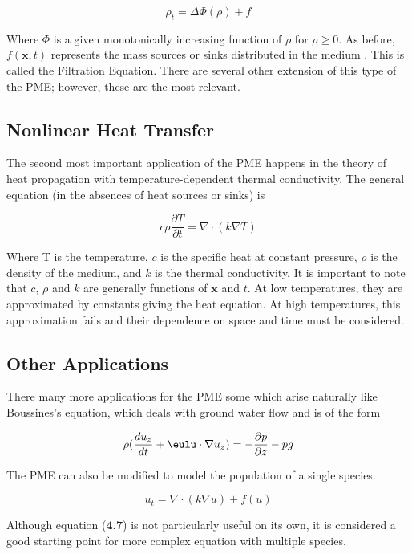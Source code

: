 \documentclass[paper=a4, fontsize=12pt]{scrartcl} %
\numberwithin{equation}{section} %
\numberwithin{table}{section} %
\begin{document}
\begin{equation}
	\rho_t = \Delta \Phi(\rho) + f
\end{equation}

Where $\Phi$ is a given monotonically increasing function of $\rho$ for $\rho \geq 0$. As before, $f(\mathbf{x},t)$ represents the mass sources or sinks distributed in the medium . This is called the Filtration Equation. There are several other extension of this type of the PME; however, these are the most relevant. 

\subsection{Nonlinear Heat Transfer}
The second most important application of the PME happens in the theory of heat propagation with temperature-dependent thermal conductivity. The general equation (in the absences of heat sources or sinks) is 

\begin{equation}
	c\rho\frac{\partial T}{\partial t} = \nabla \cdot(k\nabla T)
\end{equation}

Where T is the temperature, $c$ is the specific heat at constant pressure, $\rho$ is the density of the medium, and $k$ is the thermal conductivity. It is important to note that $c$, $\rho$ and $k$ are generally functions of $\mathbf{x}$ and $t$. At low temperatures, they are approximated by constants \textemdash giving the heat equation. At high temperatures, this approximation fails and their dependence on space and time must be considered. 
\subsection{Other Applications}
There many more applications for the PME \textemdash some which arise naturally like Boussines's equation, which deals with ground water flow and is of the form 

\begin{equation}
	\rho(\frac{du_z}{dt} +\eulu\cdot\nabla u_z) = -\frac{\partial p}{\partial z} - pg
\end{equation}

The PME can also be modified to model the population of a single species: 

\begin{equation}
	u_t = \nabla \cdot (k\nabla u) +f(u)
\end{equation}

Although equation (\textbf{4.7}) is not particularly useful on its own, it is considered a good starting point for more complex equation with multiple species. 
\end{document}
